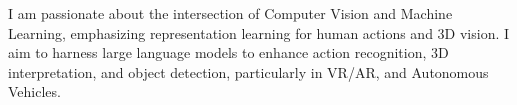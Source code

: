


\begin{cventries}

\cvtext
{ %
\begin{cvitems}
    I am passionate about the intersection of Computer Vision and Machine Learning, emphasizing representation learning for human actions and 3D vision. 
    I aim to harness large language models to enhance action recognition, 3D interpretation, and object detection, particularly in VR/AR, and Autonomous Vehicles.
\end{cvitems}
}


\end{cventries}
